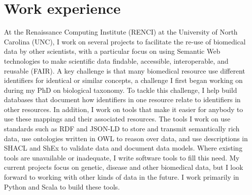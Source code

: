 

\part{Work experience}


At the Renaissance Computing Institute (RENCI) at the University of North Carolina (UNC), I work on several projects to facilitate the re-use of biomedical data by other scientists, with a particular focus on using Semantic Web technologies to make scientific data findable, accessible, interoperable, and reusable (FAIR). A key challenge is that many biomedical resource use different identifiers for identical or similar concepts, a challenge I first began working on during my PhD on biological taxonomy. To tackle this challenge, I help build databases that document how identifiers in one resource relate to identifiers in other resources. In addition, I work on tools that make it easier for anybody to use these mappings and their associated resources. The tools I work on use standards such as RDF and JSON-LD to store and transmit semantically rich data, use ontologies written in OWL to reason over data, and use descriptions in SHACL and ShEx to validate data and document data models. Where existing tools are unavailable or inadequate, I write software tools to fill this need. My current projects focus on genetic, disease and other biomedical data, but I look forward to working with other kinds of data in the future. I work primarily in Python and Scala to build these tools.

